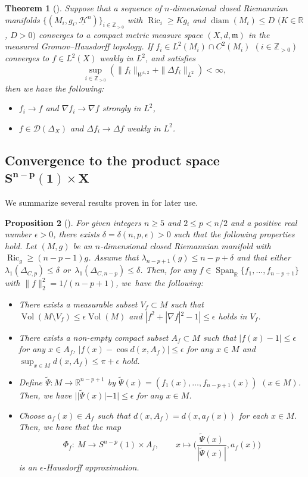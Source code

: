 \documentclass[pdftex]{sigma}
\numberwithin{equation}{section}
\newtheorem{Thm}{Theorem}[section]
\newtheorem{Prop}[Thm]{Proposition}
\theoremstyle{definition}
\newcommand{\Ric}{\operatorname{Ric}}
\newcommand{\Vol}{\operatorname{Vol}}
\newcommand{\diam}{\operatorname{diam}}
\newcommand{\Span}{\operatorname{Span}}
\newcommand{\R}{\mathbb{R}}
\newcommand{\Z}{\mathbb{Z}}
\newcommand{\mf}{\mathfrak{m}}
\newcommand{\nHa}{\underline{\mathcal{H}}}
\newcommand{\D}{\mathcal{D}}
\begin{document}
\begin{Thm}[{\cite[Theorem~1.3]{Ho1}}]\label{convf}
Suppose that a sequence of $n$-dimensional closed Riemannian manifolds $\{(M_i,g_i,\nHa^n)\}_{i\in \Z_{>0}}$ with $\Ric_i\geq K g_i$ and $\diam (M_i)\leq D$ $(K\in \R$, $D>0)$ converges to a compact metric measure space $(X,d,\mf)$ in the measured Gromov--Hausdorff topo\-logy.
If $f_i\in L^2(M_i)\cap C^2(M_i)$ $(i\in\Z_{>0})$ converges to $f\in L^2(X)$ weakly in $L^2$, and satisfies
\[
\sup_{i\in\Z_{>0}} \left(\|f_i\|_{W^{1,2}}+\|\Delta f_i\|_{L^2}\right)<\infty,
\]
then we have the following:
\begin{itemize}\itemsep=0pt
\item[$(i)$] $f_i \to f$ and $\nabla f_i\to \nabla f$ strongly in $L^2$,
\item[$(ii)$] $f\in \D(\Delta_X)$ and $\Delta f_i\to \Delta f$ weakly in $L^2$.
\end{itemize}
\end{Thm}


\subsection[Convergence to the product space S{n-p}(1) x X]{Convergence to the product space $\boldsymbol{S^{n-p}(1)\times X}$}
We summarize several results proven in \cite{Ai3} for later use.

\begin{Prop}[{\cite[Proposition~4.17, Lemma 4.22 and Theorem~4.47]{Ai3}}]\label{prev}
For given integers $n\geq 5$ and $2\leq p < n/2$ and a positive real number $\epsilon>0$, there exists $\delta=\delta(n,p,\epsilon)>0$ such that the following properties hold.
Let $(M,g)$ be an $n$-dimensional closed Riemannian manifold with $\Ric_g\geq (n-p-1)g$.
Assume that $\lambda_{n-p+1}(g)\leq n-p+\delta$ and that either
$\lambda_1(\Delta_{C,p})\leq \delta$ or~$\lambda_1(\Delta_{C,n-p})\leq \delta$.
Then, for any $f\in\Span_{\R}\{f_1,\ldots,f_{n-p+1}\}$ with $\|f\|_2^2=1/(n-p+1)$, we~have the following:
\begin{itemize}\itemsep=0pt
\item[$(i)$] There exists a measurable subset $V_f\subset M$ such that
$\Vol(M\setminus V_f)\leq \epsilon \Vol(M)$ and $|f^2+|\nabla f|^2-1|\leq \epsilon$ holds in $V_f$.
\item[$(ii)$] There exists a non-empty compact subset $A_f\subset M$ such that $|f(x)-1|\leq\epsilon$ for any $x\in A_f$, $|f(x)-\cos d(x,A_f)|\leq \epsilon$ for any $x\in M$ and $\sup_{x\in M} d(x,A_f)\leq \pi+\epsilon$ hold.
\item[$(iii)$] Define $\widetilde{\Psi}\colon M\to \R^{n-p+1}$ by $\widetilde{\Psi}(x)=(f_1(x),\ldots,f_{n-p+1}(x))$ $(x\in M)$.
Then, we have $||\widetilde{\Psi}(x)|-1|\leq \epsilon$ for any $x\in M$.
\item[$(iv)$] Choose $a_f(x)\in A_f$ such that
$d(x,A_f)=d(x,a_f(x))$ for each $x\in M$. Then, we have that the map
\[
\Phi_f \colon\ M\to S^{n-p}(1)\times A_f,\qquad
x\mapsto \bigg(\frac{\widetilde{\Psi}(x)}{|\widetilde{\Psi}(x)|}, a_f(x)\bigg)
\]
is an $\epsilon$-Hausdorff approximation.
\end{itemize}
\end{Prop}
\end{document}
